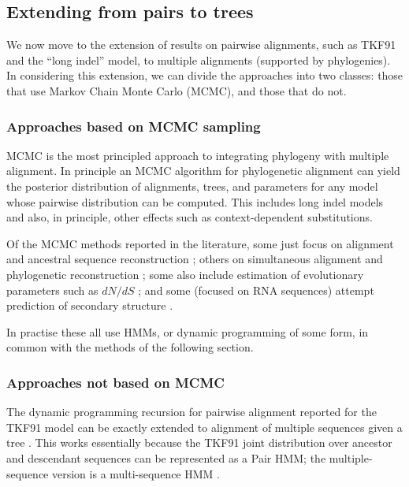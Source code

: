 \documentclass{bmcart}
\begin{document}
\subsection*{Extending from pairs to trees}

We now move to the extension of results on pairwise alignments,
such as TKF91 and the ``long indel'' model, to multiple alignments (supported by phylogenies).
In considering this extension,
we can divide the approaches into two classes:
those that use Markov Chain Monte Carlo (MCMC), and those that do not.

\subsubsection*{Approaches based on MCMC sampling}

MCMC is the most principled approach to integrating phylogeny with multiple alignment.
In principle an MCMC algorithm for phylogenetic alignment can yield the posterior distribution of
alignments, trees, and parameters for any model whose pairwise distribution can be computed.
This includes long indel models and also, in principle, other effects such as context-dependent substitutions.

Of the MCMC methods reported in the literature,
some just focus on alignment and ancestral sequence reconstruction \cite{HolmesBruno2001};
others on simultaneous alignment and phylogenetic reconstruction
\cite{RedelingsSuchard2005,SuchardRedelings2006,RedelingsSuchard2007,NovakEtAl2008,BouchardCoteEtAl2009,WestessonBarquistHolmes2012};
some also include estimation of evolutionary parameters such as $dN/dS$ \cite{Redelings2014};
and some (focused on RNA sequences) attempt prediction of secondary structure \cite{ArunapuramEtAl2013,MeyerMiklos2007}.

In practise these all use HMMs, or dynamic programming of some form,
in common with the methods of the following section.

\subsubsection*{Approaches not based on MCMC}

The dynamic programming recursion for pairwise alignment reported for the TKF91 model \cite{ThorneEtal91}
can be exactly extended to alignment of multiple sequences given a tree \cite{Hein2001,LunterSongMiklosHein2003}.
This works essentially because the TKF91 joint distribution over ancestor and descendant sequences
can be represented as a Pair HMM;
the multiple-sequence version is a multi-sequence HMM \cite{HolmesBruno2001}.
\end{document}

